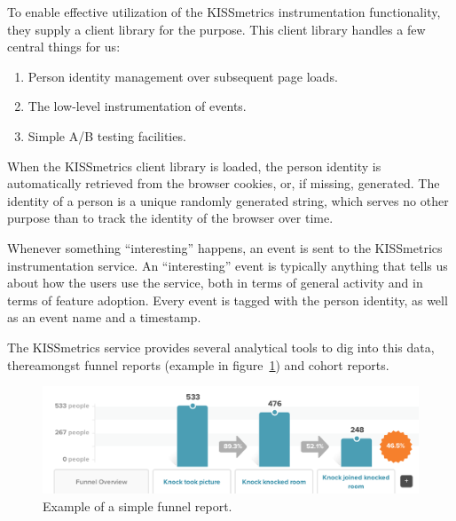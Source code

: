 To enable effective utilization of the KISSmetrics instrumentation functionality, they supply a client library for the purpose. This client library handles a few central things for us:

\begin{enumerate}
  \item Person identity management over subsequent page loads.
  \item The low-level instrumentation of events.
  \item Simple A/B testing facilities.
\end{enumerate}

When the KISSmetrics client library is loaded, the person identity is automatically retrieved from the browser cookies, or, if missing, generated. The identity of a person is a unique randomly generated string, which serves no other purpose than to track the identity of the browser over time.

Whenever something ``interesting'' happens, an event is sent to the KISSmetrics instrumentation service. An ``interesting'' event is typically anything that tells us about how the users use the service, both in terms of general activity and in terms of feature adoption. Every event is tagged with the person identity, as well as an event name and a timestamp.

The KISSmetrics service provides several analytical tools to dig into this data, thereamongst funnel reports (example in figure~\ref{fig:funnel-report}) and cohort reports.

\begin{figure}[h]
  \centering
    \includegraphics[width=\textwidth]{Figures/screenshots/km/funnel-example}
    \caption{Example of a simple funnel report.}
    \label{fig:funnel-report}
\end{figure}


